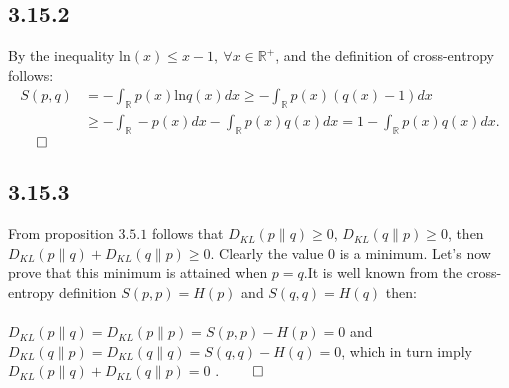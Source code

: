 \documentclass{exam}
\renewenvironment{proof}{{\noindent\itshape\ignorespaces}}{{\hfill$\qed$\\}}
\begin{document}
\subsection*{3.15.2}
By the inequality $\text{ln}(x) \leq x - 1, \ \forall x \in \mathbb{R}^{+}$, and the definition of cross-entropy follows:\\
\begin{proof}
    \begin{equation*}
        \begin{aligned}
            S(p,q) &= -\displaystyle\int_{\mathbb{R}}   p(x) \text{ln}q(x) dx \geq - \int_{\mathbb{R}} p(x)(q(x) - 1) dx \\
            &\geq -\displaystyle\int_{\mathbb{R}} - p(x) dx  -\displaystyle\int_{\mathbb{R}} p(x) q(x) dx =  1 - \displaystyle\int_{\mathbb{R}} p(x) q(x) dx.
        \end{aligned}    
    \end{equation*}
\end{proof}

\subsection*{3.15.3}
From proposition $3.5.1$ follows that $D_{KL}(p \lVert q) \geq 0$, $D_{KL}(q \lVert p ) \geq 0$, then $ D_{KL}(p \lVert q) +  D_{KL}(q \lVert p ) \geq 0$. Clearly the value 
$0$ is a minimum. Let's now prove that this minimum is attained when $p=q$.It is well known from the cross-entropy definition $S(p,p) = H(p)$ and $S(q,q) = H(q)$ then:\\
\\
\begin{proof}
    $D_{KL}(p \lVert q) = D_{KL}(p \lVert p) = S(p,p) - H(p) = 0$ and $D_{KL}(q \lVert p) = D_{KL}(q \lVert q) = S(q,q) - H(q) = 0$, which in turn imply $D_{KL}(p \lVert q) + D_{KL}(q \lVert p) = 0 \text{ .}$
\end{proof}
\end{document}
